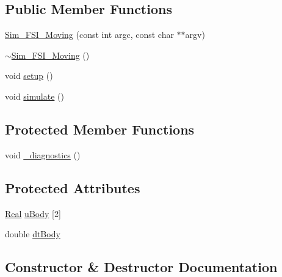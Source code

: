 \subsection*{Public Member Functions}
\begin{DoxyCompactItemize}
\item 
\hyperlink{class_sim___f_s_i___moving_a6bf59570d685a1bb99517fb4a1aa010e}{Sim\+\_\+\+F\+S\+I\+\_\+\+Moving} (const int argc, const char $\ast$$\ast$argv)
\item 
\hyperlink{class_sim___f_s_i___moving_a7de21a74e73f85426584ec607abc06ee}{$\sim$\+Sim\+\_\+\+F\+S\+I\+\_\+\+Moving} ()
\item 
void \hyperlink{class_sim___f_s_i___moving_a0e8ff3c8d37dfa22c3d696c526a14ad8}{setup} ()
\item 
void \hyperlink{class_sim___f_s_i___moving_ae20d894ac95fb1e13de88147a8bc1b3e}{simulate} ()
\end{DoxyCompactItemize}
\subsection*{Protected Member Functions}
\begin{DoxyCompactItemize}
\item 
void \hyperlink{class_sim___f_s_i___moving_aa858863674a7bffcdbaddb3aadd2f68d}{\+\_\+diagnostics} ()
\end{DoxyCompactItemize}
\subsection*{Protected Attributes}
\begin{DoxyCompactItemize}
\item 
\hyperlink{_h_d_f5_dumper_8h_a445a5f0e2a34c9d97d69a3c2d1957907}{Real} \hyperlink{class_sim___f_s_i___moving_a0375337ef732a1485729637ca0c34057}{u\+Body} \mbox{[}2\mbox{]}
\item 
double \hyperlink{class_sim___f_s_i___moving_a0afe565eb23a49fd97956ff02f0b755a}{dt\+Body}
\end{DoxyCompactItemize}


\subsection{Constructor \& Destructor Documentation}
\hypertarget{class_sim___f_s_i___moving_a6bf59570d685a1bb99517fb4a1aa010e}{}
